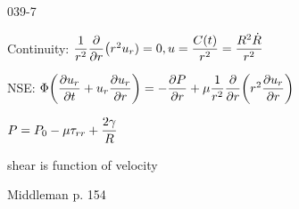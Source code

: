 \begin{mitframe}{039-7}


\begin{listone}

\item Continuity: $\dfrac{1}{\pos^2}\dfrac{\partial}{\partial\pos}\big(\pos^2\forcepot_{\pos})=0, \forcepot=\dfrac{\conc(t)}{\pos^2}=\dfrac{\gasconst^2\dot{\gasconst}}{\pos^2}$


\item NSE: $\diss\bigg(\dfrac{\partial\forcepot_{\pos}}{\partial{t}}+\forcepot_{\pos}\dfrac{\partial\forcepot_{\pos}}{\partial\pos}\bigg)=-\dfrac{\partial\p}{\partial\pos}+\chempot\dfrac{1}{\pos^2}\dfrac{\partial}{\partial\pos}\bigg(\pos^2\dfrac{\partial\forcepot_{\pos}}{\partial\pos}\bigg)$

				\begin{listtwo}
                
                \item $\p=\p_{0}-\chempot\torque_{\pos\pos}+\dfrac{2\gamma}{\gasconst}$
                
                
                \item shear is function of velocity
                
                \item Middleman p. 154
	
\end{listtwo}

\end{listone}
\end{mitframe}